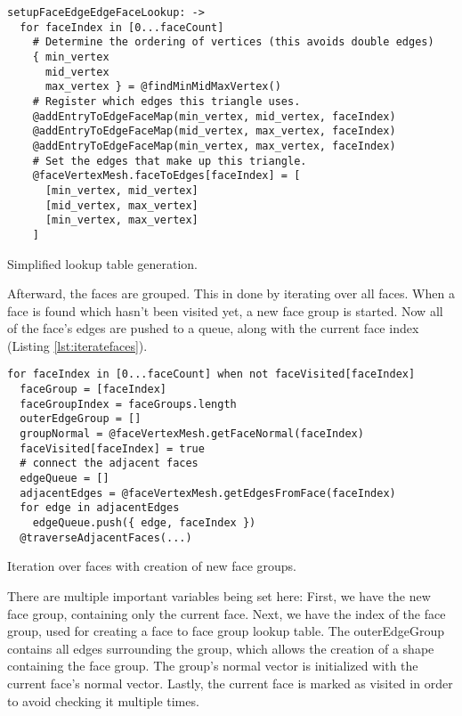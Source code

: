 \documentclass[../ClassicThesis.tex]{subfiles}
\begin{document}
\begin{listing}[ht]
\begin{verbatim}
setupFaceEdgeEdgeFaceLookup: ->
  for faceIndex in [0...faceCount]
    # Determine the ordering of vertices (this avoids double edges)
    { min_vertex
      mid_vertex
      max_vertex } = @findMinMidMaxVertex()
    # Register which edges this triangle uses.
    @addEntryToEdgeFaceMap(min_vertex, mid_vertex, faceIndex)
    @addEntryToEdgeFaceMap(mid_vertex, max_vertex, faceIndex)
    @addEntryToEdgeFaceMap(min_vertex, max_vertex, faceIndex)
    # Set the edges that make up this triangle.
    @faceVertexMesh.faceToEdges[faceIndex] = [
      [min_vertex, mid_vertex]
      [mid_vertex, max_vertex]
      [min_vertex, max_vertex]
    ]
\end{verbatim}
\caption{Simplified lookup table generation.}
\label{lst:lookuptables}
\end{listing}

Afterward, the faces are grouped. This in done by iterating over all faces. When a face is found which hasn't been visited yet, a new face group is started. Now all of the face's edges are pushed to a queue, along with the current face index (Listing \ref{lst:iteratefaces}).

\begin{listing}[ht]
\begin{verbatim}
for faceIndex in [0...faceCount] when not faceVisited[faceIndex]
  faceGroup = [faceIndex]
  faceGroupIndex = faceGroups.length
  outerEdgeGroup = []
  groupNormal = @faceVertexMesh.getFaceNormal(faceIndex)
  faceVisited[faceIndex] = true
  # connect the adjacent faces
  edgeQueue = []
  adjacentEdges = @faceVertexMesh.getEdgesFromFace(faceIndex)
  for edge in adjacentEdges
    edgeQueue.push({ edge, faceIndex })
  @traverseAdjacentFaces(...)
\end{verbatim}
\caption{Iteration over faces with creation of new face groups.}
\label{lst:iteratefaces}
\end{listing}

There are multiple important variables being set here: First, we have the new face group, containing only the current face. Next, we have the index of the face group, used for creating a face to face group lookup table. The outerEdgeGroup contains all edges surrounding the group, which allows the creation of a shape containing the face group. The group's normal vector is initialized with the current face's normal vector. Lastly, the current face is marked as visited in order to avoid checking it multiple times.
\end{document}

